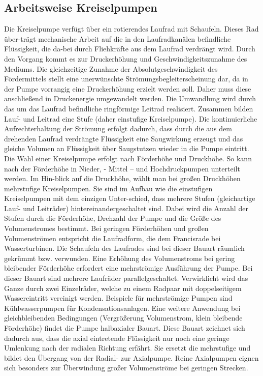 \subsection{Arbeitsweise Kreiselpumpen}
Die Kreiselpumpe verfügt über ein rotierendes Laufrad mit Schaufeln. Dieses Rad über-trägt mechanische Arbeit auf die in den Laufradkanälen befindliche Flüssigkeit, die da-bei durch Fliehkräfte aus dem Laufrad verdrängt wird. Durch den Vorgang kommt es zur Druckerhöhung und Geschwindigkeitszunahme des Mediums. Die gleichzeitige Zunahme der Absolutgeschwindigkeit des Fördermittels stellt eine unerwünschte Strömungsbegleiterscheinung dar, da in der Pumpe vorrangig eine Druckerhöhung erzielt werden soll. Daher muss diese anschließend in Druckenergie umgewandelt werden. Die Umwandlung wird durch das um das Laufrad befindliche ringförmige Leitrad realisiert. Zusammen bilden Lauf- und Leitrad eine Stufe (daher einstufige Kreiselpumpe).
Die kontinuierliche Aufrechterhaltung der Strömung erfolgt dadurch, dass durch die aus dem drehenden Laufrad verdrängte Flüssigkeit eine Saugwirkung erzeugt und das gleiche Volumen an Flüssigkeit über Saugstutzen wieder in die Pumpe eintritt. 
Die Wahl einer Kreiselpumpe erfolgt nach Förderhöhe und Druckhöhe. So kann nach der Förderhöhe in Nieder, - Mittel – und Hochdruckpumpen unterteilt werden. Im Hin-blick auf die Druckhöhe, wählt man bei großen Druckhöhen mehrstufige Kreiselpumpen. Sie sind im Aufbau wie die einstufigen Kreiselpumpen mit dem einzigen Unter-schied, dass mehrere Stufen (gleichartige Lauf- und Leiträder) hintereinandergeschaltet sind. Dabei wird die Anzahl der Stufen durch die Förderhöhe, Drehzahl der Pumpe und die Größe des Volumenstromes bestimmt. 
Bei geringen Förderhöhen und großen Volumenströmen entspricht die Laufradform, die dem Francisrade bei Wasserturbinen. Die Schaufeln des Laufrades sind bei dieser Bauart räumlich gekrümmt bzw. verwunden. Eine Erhöhung des Volumenstroms bei gering bleibender Förderhöhe erfordert eine mehrströmige Ausführung der Pumpe. Bei dieser Bauart sind mehrere Laufräder parallelgeschaltet. Verwirklicht wird das Ganze durch zwei Einzelräder, welche zu einem Radpaar mit doppelseitigem Wassereintritt vereinigt werden. Beispiele für mehrströmige Pumpen sind Kühlwasserpumpen für Kondensationsanlagen. Eine weitere Anwendung bei gleichbleibenden Bedingungen (Vergrößerung Volumenstrom, klein bleibende Förderhöhe) findet die Pumpe halbaxialer Bauart. Diese Bauart zeichnet sich dadurch aus, dass die axial eintretende Flüssigkeit nur noch eine geringe Umlenkung nach der radialen Richtung erfährt. Sie ersetzt die mehrstufige und bildet den Übergang von der Radial- zur Axialpumpe. Reine Axialpumpen eignen sich besonders zur Überwindung großer Volumenströme bei geringen Strecken.\cite{Schulz:2013}


